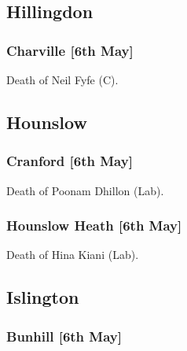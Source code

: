 \documentclass[a4paper,openany]{book}
\begin{document}
\begin{resultsiii}
\subsection*{Hillingdon}

\subsubsection*{Charville \hspace*{\fill}\nolinebreak[1]%
	\enspace\hspace*{\fill}
	[6th May]}


Death of Neil Fyfe (C).

\subsection*{Hounslow}

\subsubsection*{Cranford \hspace*{\fill}\nolinebreak[1]%
	\enspace\hspace*{\fill}
	[6th May]}


Death of Poonam Dhillon (Lab).

\subsubsection*{Hounslow Heath \hspace*{\fill}\nolinebreak[1]%
	\enspace\hspace*{\fill}
	[6th May]}


Death of Hina Kiani (Lab).

\subsection*{Islington}

\subsubsection*{Bunhill \hspace*{\fill}\nolinebreak[1]%
	\enspace\hspace*{\fill}
	[6th May]}


\end{resultsiii}
\end{document}
